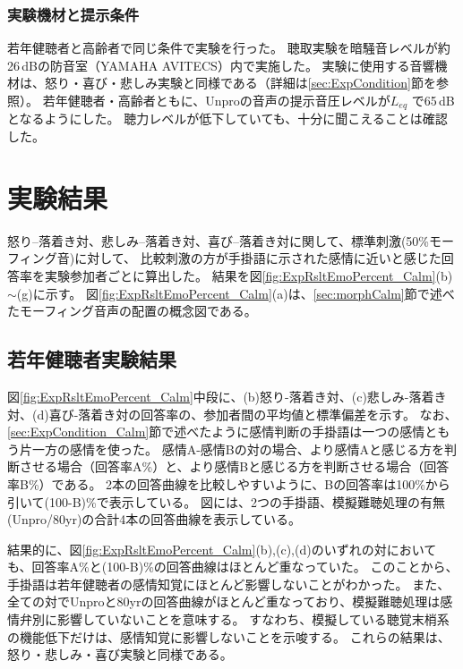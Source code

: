 \subsubsection{実験機材と提示条件}
若年健聴者と高齢者で同じ条件で実験を行った。
聴取実験を暗騒音レベルが約26\,dBの防音室（YAMAHA AVITECS）内で実施した。
実験に使用する音響機材は、怒り・喜び・悲しみ実験と同様である（詳細は\ref{sec:ExpCondition}節を参照）。
若年健聴者・高齢者ともに、Unproの音声の提示音圧レベルが${L_{eq}}$ で65\,dBとなるようにした。
聴力レベルが低下していても、十分に聞こえることは確認した。

\newpage
\section{実験結果}
\label{sec:ResultCalm}
怒り--落着き対、悲しみ--落着き対、喜び--落着き対に関して、標準刺激(50\%モーフィング音)に対して、
比較刺激の方が手掛語に示された感情に近いと感じた回答率を実験参加者ごとに算出した。
結果を図\ref{fig:ExpRsltEmoPercent_Calm}(b)$\sim$(g)に示す。
図\ref{fig:ExpRsltEmoPercent_Calm}(a)は、\ref{sec:morphCalm}節で述べたモーフィング音声の配置の概念図である。


\subsection{若年健聴者実験結果}
図\ref{fig:ExpRsltEmoPercent_Calm}中段に、(b)怒り-落着き対、(c)悲しみ-落着き対、(d)喜び-落着き対の回答率の、参加者間の平均値と標準偏差を示す。
なお、\ref{sec:ExpCondition_Calm}節で述べたように感情判断の手掛語は一つの感情ともう片一方の感情を使った。
感情A-感情Bの対の場合、より感情Aと感じる方を判断させる場合（回答率A\%）と、より感情Bと感じる方を判断させる場合（回答率B\%）である。
2本の回答曲線を比較しやすいように、Bの回答率は100\%から引いて(100-B)\%で表示している。
図には、2つの手掛語、模擬難聴処理の有無(Unpro/80yr)の合計4本の回答曲線を表示している。

結果的に、図\ref{fig:ExpRsltEmoPercent_Calm}(b),(c),(d)のいずれの対においても、回答率A\%と(100-B)\%の回答曲線はほとんど重なっていた。
このことから、手掛語は若年健聴者の感情知覚にほとんど影響しないことがわかった。
また、全ての対でUnproと80yrの回答曲線がほとんど重なっており、模擬難聴処理は感情弁別に影響していないことを意味する。
すなわち、模擬している聴覚末梢系の機能低下だけは、感情知覚に影響しないことを示唆する。
これらの結果は、怒り・悲しみ・喜び実験と同様である。

